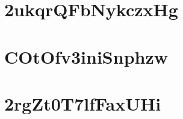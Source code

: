 

\chapter{2ukqrQFbNykczxHg}
\label{WhatCMakeWillDo}






\chapter{COtOfv3iniSnphzw}
\label{ForSpringheadUsers}






\chapter{2rgZt0T7lfFaxUHi}
\label{ForSpringheadDevelopper}





